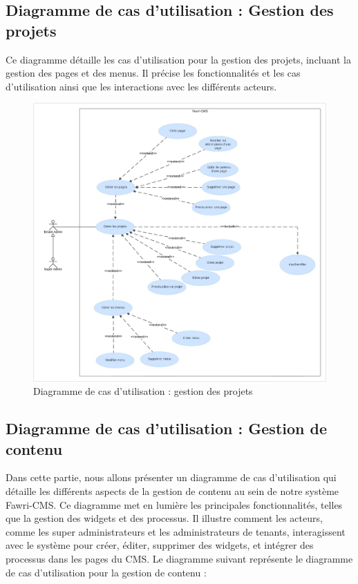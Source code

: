 \subsection{Diagramme de cas d'utilisation : Gestion des projets}

\hspace{\parindent}Ce diagramme détaille les cas d'utilisation pour la gestion des projets, incluant la gestion des pages et des menus. Il précise les fonctionnalités et les cas d'utilisation ainsi que les interactions avec les différents acteurs.



\begin{figure}[H]
  \centering
  \includegraphics[width=17cm]{Figures/use case gestion des projets.png}
  \caption{Diagramme de cas d'utilisation : gestion des projets}
\end{figure}



\subsection{Diagramme de cas d’utilisation : Gestion de contenu}
\hspace{\parindent}Dans cette partie, nous allons présenter un diagramme de cas d'utilisation qui détaille les différents aspects de la gestion de contenu au sein de notre système Fawri-CMS. Ce diagramme met en lumière les principales fonctionnalités, telles que la gestion des widgets et des processus. Il illustre comment les acteurs, comme les super administrateurs et les administrateurs de tenants, interagissent avec le système pour créer, éditer, supprimer des widgets, et intégrer des processus dans les pages du CMS. Le diagramme suivant représente le diagramme de cas d'utilisation pour la gestion de contenu :

